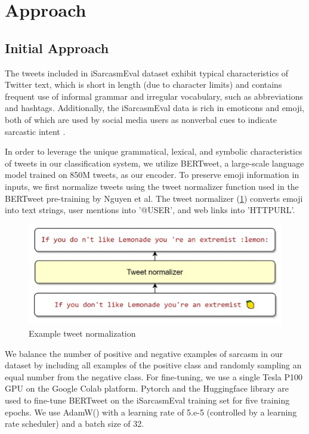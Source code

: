 \documentclass[11pt]{article}
\begin{document}
\section{Approach}
\subsection{Initial Approach}
The tweets included in iSarcasmEval dataset exhibit typical characteristics of Twitter text, which is short in length (due to character limits) and contains frequent use of informal grammar and irregular vocabulary, such as abbreviations and hashtags. Additionally, the iSarcasmEval data is rich in emoticons and emoji, both of which are used by social media users as nonverbal cues to indicate sarcastic intent \citealp{doi:10.1080/17470218.2015.1106566}.

In order to leverage the unique grammatical, lexical, and symbolic characteristics of tweets in our classification system, we utilize BERTweet, a large-scale language model trained on 850M tweets, as our encoder. To preserve emoji information in inputs, we first normalize tweets using the tweet normalizer function used in the BERTweet pre-training by Nguyen et al. The tweet normalizer (\ref{fig:example-tweet-normalization}) converts emoji into text strings, user mentions into '@USER', and web links into 'HTTPURL'.

\begin{figure}[h!]
    \includegraphics[width=.5\textwidth]{Picture2.jpg}
    \caption{Example tweet normalization}
    \label{fig:example-tweet-normalization}
\end{figure}

We balance the number of positive and negative examples of sarcasm in our dataset by including all examples of the positive class and randomly sampling an equal number from the negative class. For fine-tuning, we use a single Tesla P100 GPU on the Google Colab platform. Pytorch and the Huggingface library are used to fine-tune BERTweet on the iSarcasmEval training set for five training epochs. We use AdamW(\citealp{https://doi.org/10.48550/arxiv.1711.05101}) with a learning rate of 5.e-5 (controlled by a learning rate scheduler) and a batch size of 32.
\end{document}

